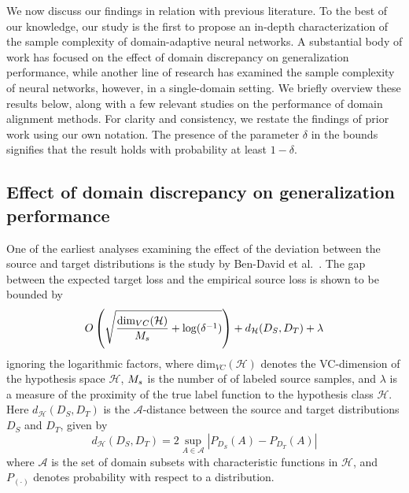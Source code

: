 \documentclass[review,supplement,onefignum,onetabnum]{siamonline250211}
\begin{document}
We now discuss our findings in relation with previous literature. To the best of our knowledge, our study is the first to propose an in-depth characterization of the sample complexity of domain-adaptive neural networks. A substantial body of work has focused on the effect of domain discrepancy on generalization performance, while another line of research has examined the sample complexity of neural networks, however, in a single-domain setting. We briefly overview these results below, along with a few relevant studies on the performance of domain alignment methods.  For clarity and consistency, we restate the findings of prior work using our own notation. The presence of the parameter $\delta$ in the bounds signifies that the result holds with probability at least $1-\delta$.

\subsection{Effect of domain discrepancy on generalization performance}




One of the earliest analyses examining the effect of the deviation between the source and target distributions is the study by Ben-David et al.~\cite{BenDavidBCP06}. The gap between the expected target loss and the empirical source loss is shown to be bounded by
%
\[
O\left(  
\sqrt{ \frac{\text{dim}_{VC}(\mathcal{H})}{M_s} + \log(\delta^{-1})} \right) + d_{\mathcal{H}}(D_S, D_T) + \lambda
\]
%
ignoring the logarithmic factors, where $\text{dim}_{VC}(\mathcal{H})$ denotes the VC-dimension of the hypothesis space $\mathcal{H}$, $M_s$ is the number of of labeled source samples, and $\lambda$ is a  measure of  the proximity of the true label function to the hypothesis class $\mathcal{H}$. Here  $d_{\mathcal{H}}(D_S, D_T)$ is the $\mathcal{A}$-distance \cite{BenDavidBCP06} between the source and target distributions $D_S$ and $D_T$, given by
%
\[
 d_{\mathcal{H}}(D_S, D_T) = 2 \sup_{A \in \mathcal{A}} | P_{D_S}(A) - P_{D_T}(A) |
\]
%
where $\mathcal{A}$ is the set of domain subsets with characteristic functions in $\mathcal{H}$, and $P_{(\cdot)}$ denotes probability with respect to a distribution.
\end{document}
